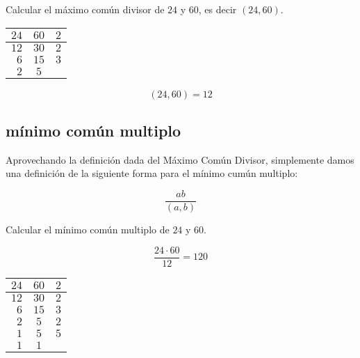         \begin{ejemplo}
            Calcular el máximo común divisor de $24$ y $60$, es decir $(24, 60)$.

            \begin{center}
                    \begin{tabular}{r c | l}
                    $24$ & $60$ & $2$ \\
                    \hline
                    $12$ & $30$ & $2$ \\
                    $6$ & $15$ & $3$ \\
                    $2$ & $5$ & 
                \end{tabular}
            \end{center}

            \begin{equation*}
                (24, 60) = 12
            \end{equation*}
        \end{ejemplo}


    \subsection{mínimo común multiplo}

        \begin{definicion}
            Aprovechando la definición dada del Máximo Común Divisor, simplemente damos una definición de la siguiente forma para el mínimo cumún multiplo:

            \begin{equation}
                \frac{ab}{(a, b)}
            \end{equation}
        \end{definicion}

        \begin{ejemplo}
            Calcular el mínimo común multiplo de $24$ y $60$.

            \begin{equation*}
                \frac{24 \cdot 60}{12} = 120
            \end{equation*}

            \begin{center}
                    \begin{tabular}{r c | l}
                    $24$ & $60$ & $2$ \\
                    \hline
                    $12$ & $30$ & $2$ \\
                    $6$ & $15$ & $3$ \\
                    $2$ & $5$ & $2$ \\
                    $1$ & $5$ & $5$ \\
                    $1$ & $1$ & 
                \end{tabular}
            \end{center}
        \end{ejemplo}

